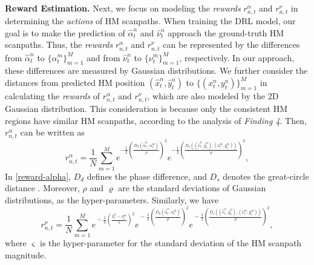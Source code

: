 \documentclass[10pt,journal,compsoc]{IEEEtran}
\begin{document}
\textbf{Reward Estimation.}
Next, we focus on modeling the \textit{rewards} $r^{\alpha}_{n,t}$ and $r^{\nu}_{n,t}$ in determining the \textit{actions} of HM scanpaths.
When training the DRL model, our goal is to make the prediction of $\hat{\alpha}^n_{t}$ and $\hat{\nu}^n_{t}$ approach the ground-truth HM scanpaths.
Thus, the  \textit{rewards} $r^{\alpha}_{n,t}$ and $r^{\nu}_{n,t}$ can be represented by the differences from $\hat{\alpha}^n_{t}$  to $\{{\alpha}^m_{t}\}_{m=1}^M$ and from $\hat{\nu}^n_{t}$ to $\{{\nu}^m_{t}\}_{m=1}^M$, respectively.
In our approach, these differences are measured by Gaussian distributions.
We further consider the distances from predicted HM position $(\hat{x}^n_t,\hat{y}^n_t)$ to $\{(x^{n}_{t},y^{n}_{t})\}_{m=1}^M$ in calculating the \textit{rewards} of $r^{\alpha}_{n,t}$ and $r^{\nu}_{n,t}$, which are also modeled by the 2D Gaussian distribution.
This consideration is because only the consistent HM regions have similar HM scanpaths, according to the analysis of \textit{Finding 4}.
Then, $r^{\alpha}_{n,t}$ can be written as
\begin{equation}
\label{reward-alpha}
r^{\alpha}_{n,t} = \frac{1}{N}\sum_{m=1}^{M} e^{-\frac{1}{2}\left(\frac{D_d(\hat{\alpha}^n_{t}, \alpha^m_{t})}{\rho}\right)^2} e^{-\frac{1}{2}\left(\frac{D_s((\hat{x}^n_{t},\hat{y}^n_{t}),(x^m_{t},y^m_{t}))}{\varrho}\right)^2},
\end{equation}
In \eqref{reward-alpha}, $D_d$ defines the phase difference, and $D_s$ denotes the great-circle distance \cite{shumaker1984astronomical}. Moreover, $\rho$ and $\varrho$ are the standard deviations of Gaussian distributions, as the hyper-parameters. Similarly, we have
\begin{equation}
\label{reward-nu}
r^{\nu}_{n,t} \!\!=\!\! \frac{1}{N}\!\sum_{m=1}^{M}\!
e^{\!-\frac{1}{2}\left(\!{\frac{\hat{\nu}^n_{t}-\nu^{m}_{t}}{\varsigma}}\!\right)^2} \! e^{\!-\frac{1}{2}\left(\!\frac{D_d(\hat{\alpha}^n_{t}, \alpha^m_{t})}{\rho}\!\right)^2} \!\!e^{\!-\frac{1}{2}\left(\!\frac{D_s((\hat{x}^n_{t},\hat{y}^n_{t}),(x^m_{t},y^m_{t}))}{\varrho}\!\right)^2},
\end{equation}
where $\varsigma$ is the hyper-parameter for the standard deviation of the HM scanpath magnitude.
\end{document}

